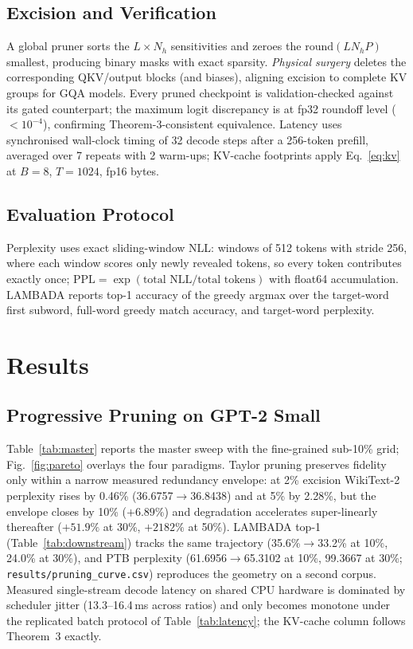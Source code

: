 \documentclass[10pt,journal,compsoc]{IEEEtran}
\newcommand{\ppl}{\mathrm{PPL}}
\begin{document}
\subsection{Excision and Verification}
A global pruner sorts the $L\times N_h$ sensitivities and zeroes the
$\mathrm{round}(LN_hP)$ smallest, producing binary masks with exact sparsity.
\emph{Physical surgery} deletes the corresponding QKV/output blocks (and biases),
aligning excision to complete KV groups for GQA models. Every pruned checkpoint is
validation-checked against its gated counterpart; the maximum logit discrepancy is
at fp32 roundoff level ($<10^{-4}$), confirming Theorem-3-consistent
equivalence. Latency uses synchronised wall-clock timing of 32 decode steps after
a 256-token prefill, averaged over 7 repeats with 2 warm-ups; KV-cache footprints
apply Eq.~\ref{eq:kv} at $B{=}8$, $T{=}1024$, fp16 bytes.

\subsection{Evaluation Protocol}
Perplexity uses exact sliding-window NLL: windows of 512 tokens with stride 256,
where each window scores only newly revealed tokens, so every token contributes
exactly once; $\ppl=\exp(\text{total NLL}/\text{total tokens})$ with float64
accumulation. LAMBADA reports top-1 accuracy of the greedy argmax over the
target-word first subword, full-word greedy match accuracy, and target-word
perplexity.

\section{Results}
\subsection{Progressive Pruning on GPT-2 Small}
Table~\ref{tab:master} reports the master sweep with the fine-grained sub-10\% grid;
Fig.~\ref{fig:pareto} overlays the four paradigms. Taylor pruning preserves fidelity
only within a narrow measured redundancy envelope: at 2\% excision WikiText-2
perplexity rises by 0.46\% (36.6757$\to$36.8438) and at 5\% by 2.28\%, but the
envelope closes by 10\% ($+6.89\%$) and degradation accelerates super-linearly
thereafter ($+51.9\%$ at 30\%, $+2182\%$ at 50\%). LAMBADA top-1
(Table~\ref{tab:downstream}) tracks the same trajectory (35.6\%$\to$33.2\% at 10\%,
24.0\% at 30\%), and PTB perplexity (61.6956$\to$65.3102 at 10\%, 99.3667 at 30\%;
\texttt{results/pruning\_curve.csv}) reproduces the geometry on a second corpus. Measured single-stream decode latency on shared CPU hardware is
dominated by scheduler jitter (13.3--16.4\,ms across ratios) and only becomes
monotone under the replicated batch protocol of Table~\ref{tab:latency}; the
KV-cache column follows Theorem~3 exactly.
\end{document}
